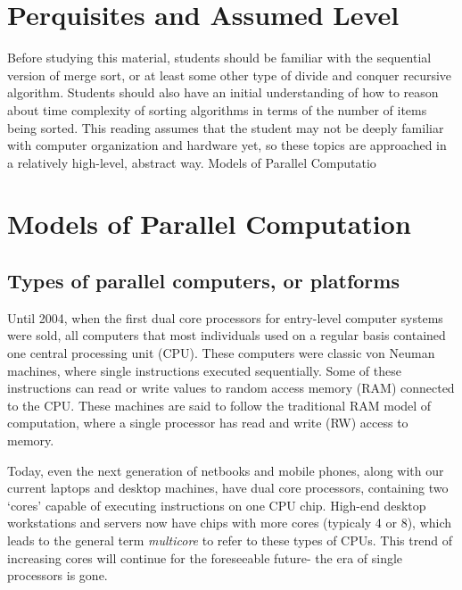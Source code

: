 \documentclass[letterpaper,10pt,openany,oneside]{sphinxmanual}
\begin{document}
\section{Perquisites and Assumed Level}
\label{ParallelMachineModels/ParallelMachineModels:perquisites-and-assumed-level}
Before studying this material, students should be familiar with the sequential version of merge sort, or at least some other type of divide and conquer recursive algorithm.  Students should also have an initial understanding of how to reason about time complexity of sorting algorithms in terms of the number of items being sorted. This reading assumes that the student may not be deeply familiar with computer organization and hardware yet, so these topics are approached in a relatively high-level, abstract way.
Models of Parallel Computatio


\section{Models of Parallel Computation}
\label{ParallelMachineModels/ParallelMachineModels:models-of-parallel-computation}

\subsection{Types of parallel computers, or platforms}
\label{ParallelMachineModels/ParallelMachineModels:types-of-parallel-computers-or-platforms}
Until 2004, when the first dual core processors for entry-level computer systems were sold, all computers that most individuals used on a regular basis contained one central processing unit (CPU).  These computers were classic von Neuman machines, where single instructions executed sequentially. Some of these instructions can read or write values to random access memory (RAM) connected to the CPU.  These machines are said to follow the traditional RAM model of computation, where a single processor has read and write (RW) access to memory.

Today, even the next generation of netbooks and mobile phones, along with our current laptops and desktop machines, have dual core processors, containing two ‘cores’ capable of executing instructions on one CPU chip.  High-end desktop workstations and servers now have chips with more cores (typicaly 4 or 8), which leads to the general term \emph{multicore} to refer to these types of CPUs.  This trend of increasing cores will continue for the foreseeable future- the era of single processors is gone.
\end{document}
